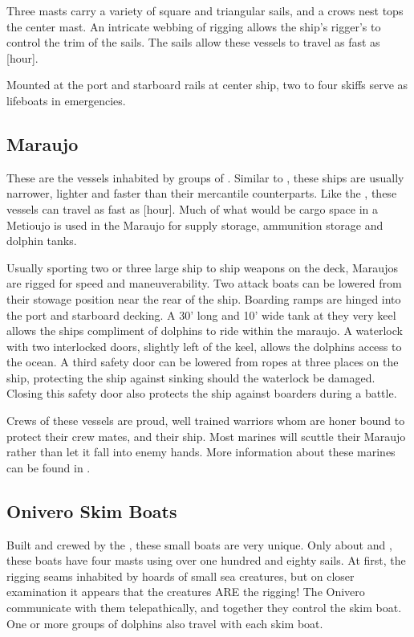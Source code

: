 \begin{multicols*}{2}
Three masts carry a variety of square and triangular sails, and a crows nest tops the center mast. An intricate webbing of rigging allows the ship's rigger's to control the trim of the sails. The sails allow these vessels to travel as fast as [hour].

Mounted at the port and starboard rails at center ship, two to four skiffs serve as lifeboats in emergencies.
\subsection{Maraujo}
These are the vessels inhabited by groups of . Similar to , these ships are usually narrower, lighter and faster than their mercantile counterparts. Like the , these vessels can travel as fast as [hour]. Much of what would be cargo space in a Metioujo is used in the Maraujo for supply storage, ammunition storage and dolphin tanks.

Usually sporting two or three large ship to ship weapons on the deck, Maraujos are rigged for speed and maneuverability. Two attack boats can be lowered from their stowage position near the rear of the ship. Boarding ramps are hinged into the port and starboard decking.
A 30' long and 10' wide tank at they very keel allows the ships compliment of dolphins to ride within the maraujo. A waterlock with two interlocked doors, slightly left of the keel, allows the dolphins access to the ocean. A third safety door can be lowered from ropes at three places on the ship, protecting the ship against sinking should the waterlock be damaged. Closing this safety door also protects the ship against boarders during a battle.

Crews of these vessels are proud, well trained warriors whom are honer bound to protect their crew mates, and their ship. Most marines will scuttle their Maraujo rather than let it fall into enemy hands. More information about these marines can be found in .
\subsection{Onivero Skim Boats}
Built and crewed by the , these small boats are very unique. Only about  and , these boats have four masts using over one hundred and eighty sails. At first, the rigging seams inhabited by hoards of small sea creatures, but on closer examination it appears that the creatures ARE the rigging! The Onivero communicate with them telepathically, and together they control the skim boat. One or more groups of dolphins also travel with each skim boat.


\end{multicols*}
